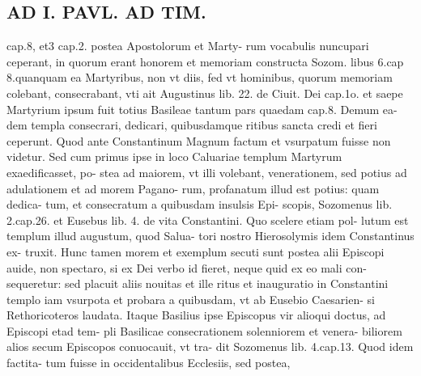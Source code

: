\documentclass{article}
\begin{document}
\begin{pages}
\section*{AD I. PAVL. AD TIM. }
\marginpar{[ p.72 ]}\pstart cap.8, et3 cap.2. postea Apostolorum et Marty- rum vocabulis nuncupari ceperant, in quorum erant honorem et memoriam constructa Sozom. libus  6.cap 8.quanquam ea Martyribus, non vt diis, fed vt hominibus, quorum memoriam colebant, consecrabant, vti ait Augustinus lib. 22. de Ciuit. Dei cap.1o. et saepe Martyrium ipsum fuit totius Basileae tantum pars quaedam cap.8. Demum ea- dem templa consecrari, dedicari, quibusdamque ritibus sancta credi et fieri ceperunt. Quod ante Constantinum Magnum factum et vsurpatum fuisse non videtur. Sed cum primus ipse in loco Caluariae templum Martyrum exaedificasset, po- stea ad maiorem, vt illi volebant, venerationem, sed potius ad adulationem et ad morem Pagano- rum, profanatum illud est potius: quam dedica- tum, et consecratum a quibusdam insulsis Epi- scopis, Sozomenus lib. 2.cap.26. et Eusebus lib. 4. de vita Constantini. Quo scelere etiam pol- lutum est templum illud augustum, quod Salua- tori nostro Hierosolymis idem Constantinus ex- truxit. Hunc tamen morem et exemplum secuti sunt postea alii Episcopi auide, non spectaro, si ex Dei verbo id fieret, neque quid ex eo mali con- sequeretur: sed placuit aliis nouitas et ille ritus et inauguratio in Constantini templo iam vsurpota et probara a quibusdam, vt ab Eusebio Caesarien- si Rethoricoteros laudata. Itaque Basilius ipse Episcopus vir alioqui doctus, ad Episcopi etad tem- pli Basilicae consecrationem solenniorem et venera- biliorem alios secum Episcopos conuocauit, vt tra- dit Sozomenus lib. 4.cap.13. Quod idem factita- tum fuisse in occidentalibus Ecclesiis, sed postea,  \pend

\end{pages}
\end{document}
